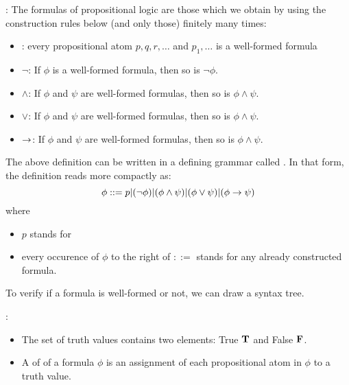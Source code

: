   : The  formulas of propositional logic are those which we obtain by using the construction rules below (and only those) finitely many times:
  \begin{itemize}
    \item {}: every propositional atom $p, q, r, \ldots$ and $p_1, \ldots$  is a well-formed formula
    \item $\lnot$: If $\phi$ is a well-formed formula, then so is $\lnot \phi$.
    \item $\land$: If $\phi$ and $\psi$ are well-formed formulas, then so is $\phi \land \psi$.
    \item $\lor$: If $\phi$ and $\psi$ are well-formed formulas, then so is $\phi \land \psi$.
    \item $\rightarrow$: If $\phi$ and $\psi$ are well-formed formulas, then so is $\phi \land \psi$.
  \end{itemize}

  \par The above definition can be written in a defining grammar called . In that form, the definition reads more compactly as:
    \[
      \phi ::= p | (\lnot \phi) | (\phi \land \psi) | (\phi \lor \psi) | (\phi \rightarrow \psi)
    \]
    where
    \begin{itemize}
      \item $p$ stands for 
      \item every occurence of $\phi$ to the right of $::=$ stands for any already constructed formula.
    \end{itemize}

  \par To verify if a formula is well-formed or not, we can draw a syntax tree.

  :
    \begin{itemize}
      \item The set of truth values contains two elements: True $\mathbf{T}$ and False $\mathbf{F}$.
      \item A  of  of a formula $\phi$ is an assignment of each propositional atom in $\phi$ to a truth value.
    \end{itemize}

